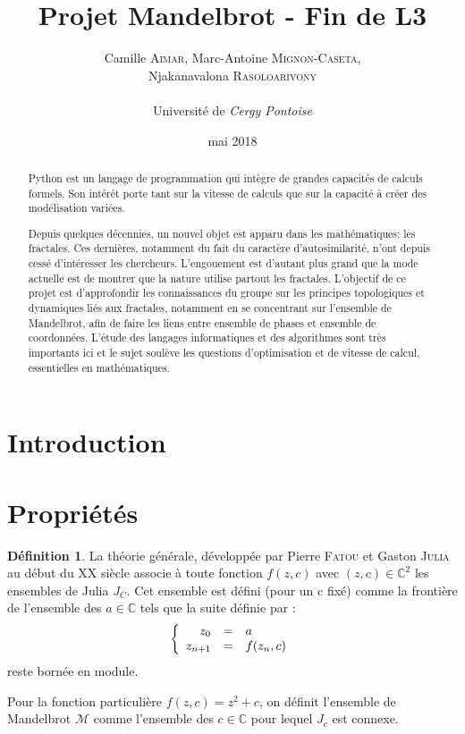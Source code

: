 \documentclass[12pt,a4paper]{article}
\title{Projet Mandelbrot - Fin de L3}
\author{Camille \textsc{Aimar}, Marc-Antoine \textsc{Mignon-Caseta},\\Njakanavalona \textsc{Rasoloarivony} \\ \\ Université de\emph{ Cergy Pontoise}}
\date{mai 2018}
\theoremstyle{plain}
\theoremstyle{plain}
\theoremstyle{definition}
\newtheorem{definition}{Définition}
\theoremstyle{remark}
\begin{document}
\maketitle
\newpage
\begin{abstract}
Python est un langage de programmation qui intègre de grandes capacités de calculs formels. Son intérêt porte tant sur la vitesse de calculs que sur la capacité à créer des modélisation variées.
 
Depuis quelques décennies, un nouvel objet est apparu dans les mathématiques: les fractales. Ces dernières, notamment du fait du caractère d’autosimilarité, n'ont depuis cessé d'intéresser les chercheurs. L'engouement est d’autant plus grand que la mode actuelle est de montrer que la nature utilise partout les fractales. 
L'objectif de ce projet est d'approfondir les connaissances du groupe sur les principes topologiques et dynamiques liés aux fractales, notamment en se concentrant sur l'ensemble de Mandelbrot, afin de faire les liens entre ensemble de phases et ensemble de coordonnées. 
L'étude des langages informatiques et des algorithmes sont très importants ici et le sujet soulève les questions d'optimisation et de vitesse de calcul, essentielles en mathématiques. 
\end{abstract}
\section{Introduction}

\newpage
\section{Propriétés}
	\begin{definition}
La théorie générale, développée par Pierre \textsc{Fatou} et Gaston \textsc{Julia} au début du \textsc{XX}\ieme {} siècle associe à toute fonction $f(z,c)$ avec $(z,c) \in \mathbb{C}^2$ les ensembles de Julia $J_C$. Cet ensemble est défini (pour un c fixé) comme la frontière de l'ensemble des $a \in \mathbb{C}$ tels que la suite définie par :
\begin{equation}\label{julia}
\left\{
\begin{array}{r c l}
z_0 &=& a\\
z_{n+1} &=& f(z_n, c)
\end{array}
\right.
\end{equation}
reste bornée en module.
\end{definition}

Pour la fonction particulière $f(z,c)=z^2+c$, on définit l'ensemble de Mandelbrot $\mathcal{M}$ comme l'ensemble des $c \in \mathbb{C}$ pour lequel $J_c$ est connexe.
\end{document}
